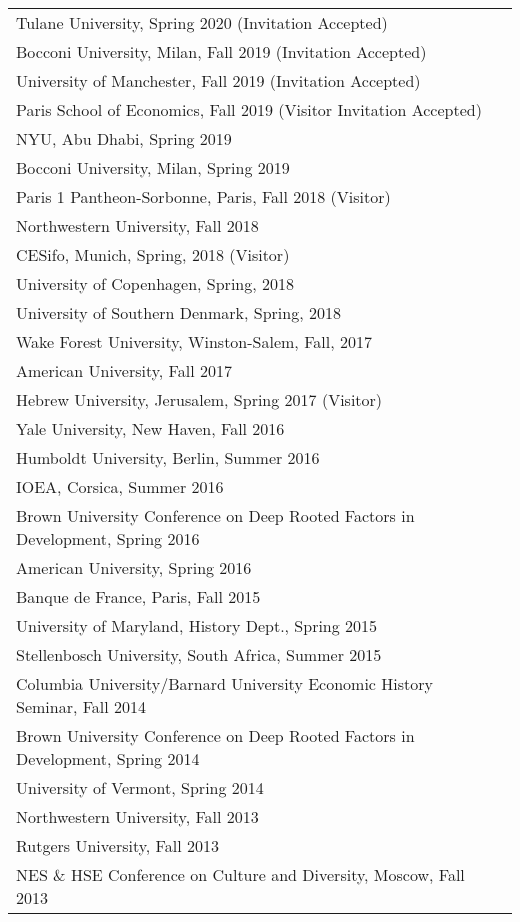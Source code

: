 \documentclass[11pt,fullpage]{article}
\begin{document}
\begin{tabular}{ll}
	Tulane University, Spring 2020 (Invitation Accepted)\\
	Bocconi University, Milan, Fall 2019 (Invitation Accepted)\\
	University of Manchester, Fall 2019 (Invitation Accepted)\\
	Paris School of Economics, Fall 2019 (Visitor Invitation Accepted)\\
	NYU, Abu Dhabi, Spring 2019 \\
	Bocconi University, Milan, Spring 2019  \\
	Paris 1 Pantheon-Sorbonne, Paris, Fall 2018 (Visitor) \\
	Northwestern University, Fall 2018 \\
	CESifo, Munich, Spring, 2018 (Visitor) \\
	University of Copenhagen, Spring, 2018 \\
	University of Southern Denmark, Spring, 2018 \\
	Wake Forest University, Winston-Salem, Fall, 2017 \\
	American University, Fall 2017 \\
	Hebrew University, Jerusalem, Spring 2017 (Visitor) \\
	Yale University, New Haven, Fall 2016\\
	Humboldt University, Berlin, Summer 2016\\
	IOEA, Corsica, Summer 2016\\
	Brown University Conference on Deep Rooted Factors in Development, Spring 2016 \\
	American University, Spring 2016 \\
	Banque de France, Paris, Fall 2015 \\
	University of Maryland, History Dept., Spring 2015 \\
	Stellenbosch University, South Africa, Summer 2015 \\
	Columbia University/Barnard University Economic History Seminar, Fall 2014\\
	Brown University Conference on Deep Rooted Factors in Development, Spring 2014\\
	University of Vermont, Spring 2014\\
	Northwestern University, Fall 2013 \\
	Rutgers University, Fall 2013 \\
	NES \& HSE Conference on Culture and Diversity, Moscow, Fall 2013 \\

\end{tabular}
\end{document}
